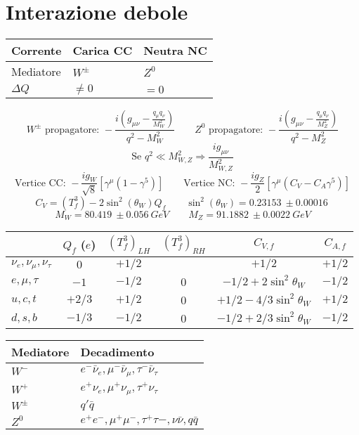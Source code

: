 \documentclass[10pt, onecolumn, a4paper]{article}
\def\({\left(}
\def\){\right)}
\def\[{\left[}
\def\]{\right]}
\begin{document}
\section{Interazione debole} %
\begin{center}
\begin{tabularx}{\textwidth}{X X X}
\toprule
Corrente & Carica CC & Neutra NC \\
\midrule
Mediatore & $W^{\pm}$ & $Z^0$ \\
$\Delta Q$ & $\neq 0$ & $=0$ \\
\bottomrule
\end{tabularx}
\end{center}
$$W^{\pm}\textrm{ propagatore: } -\frac{i\(g_{\mu\nu}-\frac{q_{\mu}q_{\nu}}{M_W^2}\)}{q^2-M_W^2} \qquad Z^0 \textrm{ propagatore: } -\frac{i\(g_{\mu\nu}-\frac{q_{\mu}q_{\nu}}{M_Z^2}\)}{q^2-M_Z^2}$$
$$\textrm{Se } q^2\ll M_{W,Z}^2 \Longrightarrow \frac{ig_{\mu\nu}}{M_{W,Z}^2}$$
$$\textrm{Vertice CC: } -\frac{ig_W}{\sqrt{8}}\[\gamma^{\mu}\(1-\gamma^5\)\] \qquad \textrm{Vertice NC: } -\frac{ig_Z}{2}\[\gamma^{\mu}\(C_V-C_A\gamma^5\)\]$$
$$C_V=\(T_f^3\)-2\sin^2{\(\theta_W\)}Q_f \qquad \sin^2{\(\theta_W\)}=\SI{0.23153}{}\pm\SI{0.00016}{}$$
$$M_W=\SI{80.419}{}\pm\SI{0.056}{GeV} \qquad M_Z=\SI{91.1882}{}\pm\SI{0.0022}{GeV}$$
\begin{center}
\begin{tabularx}{\textwidth}{X | c c c | c c}
\toprule
 & $Q_f$ ($e$) & $\(T_f^3\)_{LH}$ & $\(T_f^3\)_{RH}$ & $C_{V,f}$ & $C_{A,f}$ \\
\midrule
$\nu_e, \nu_\mu, \nu_\tau$ & $0$ & $+1/2$ &  & $+1/2$ & $+1/2$ \\
$e, \mu, \tau$ & $-1$ & $-1/2$ & $0$ & $-1/2+2\sin^2{\theta_W}$ & $-1/2$ \\
\midrule
$u, c, t$ & $+2/3$ & $+1/2$ & $0$ & $+1/2-4/3\sin^2{\theta_W}$ & $+1/2$ \\
$d, s, b$ & $-1/3$ & $-1/2$ & $0$ & $-1/2+2/3\sin^2{\theta_W}$ & $-1/2$ \\
\bottomrule
\end{tabularx}
\end{center}
\begin{center}
\begin{tabularx}{\textwidth}{X X}
\toprule
Mediatore & Decadimento \\
\midrule
$W^-$ & $e^-\bar\nu_e, \mu^-\bar\nu_\mu, \tau^-\bar\nu_\tau$ \\
$W^+$ & $e^+\nu_e, \mu^+\nu_\mu, \tau^+\nu_\tau$ \\
$W^{\pm}$ & $q'\bar q$ \\
\midrule
$Z^0$ & $e^+e^-, \mu^+\mu^-, \tau^+\tau-, \nu\bar\nu, q\bar q$ \\
\bottomrule
\end{tabularx}
\end{center}
\end{document}
